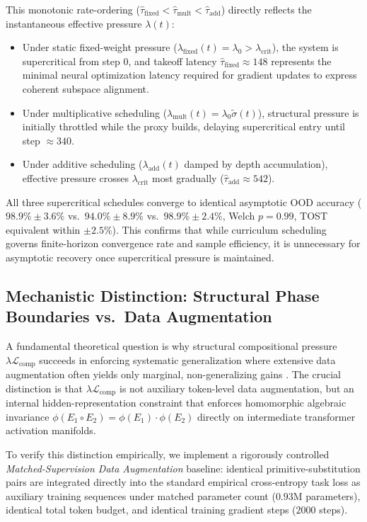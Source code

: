 \documentclass{article}
\theoremstyle{plain}
\theoremstyle{definition}
\begin{document}
This monotonic rate-ordering ($\hat{\tau}_{\text{fixed}} < \hat{\tau}_{\text{mult}} < \hat{\tau}_{\text{add}}$) directly reflects the instantaneous effective pressure $\lambda(t)$:
\begin{itemize}[noitemsep]
    \item Under static fixed-weight pressure ($\lambda_{\text{fixed}}(t) = \lambda_0 > \lambda_{\text{crit}}$), the system is supercritical from step 0, and takeoff latency $\hat{\tau}_{\text{fixed}} \approx 148$ represents the minimal neural optimization latency required for gradient updates to express coherent subspace alignment.
    \item Under multiplicative scheduling ($\lambda_{\text{mult}}(t) = \lambda_0 \tilde{\sigma}(t)$), structural pressure is initially throttled while the proxy builds, delaying supercritical entry until step $\approx 340$.
    \item Under additive scheduling ($\lambda_{\text{add}}(t)$ damped by depth accumulation), effective pressure crosses $\lambda_{\text{crit}}$ most gradually ($\hat{\tau}_{\text{add}} \approx 542$).
\end{itemize}
All three supercritical schedules converge to identical asymptotic OOD accuracy ($98.9\% \pm 3.6\%$ vs.\ $94.0\% \pm 8.9\%$ vs.\ $98.9\% \pm 2.4\%$, Welch $p = 0.99$, TOST equivalent within $\pm 2.5\%$). This confirms that while curriculum scheduling governs finite-horizon convergence rate and sample efficiency, it is unnecessary for asymptotic recovery once supercritical pressure is maintained.

\subsection{Mechanistic Distinction: Structural Phase Boundaries vs.\ Data Augmentation}
\label{sec:data_aug_distinction}
A fundamental theoretical question is why structural compositional pressure $\lambda \mathcal{L}_{\text{comp}}$ succeeds in enforcing systematic generalization where extensive data augmentation often yields only marginal, non-generalizing gains \citep{Furrer2020Compositional,Jia2016Data}. The crucial distinction is that $\lambda \mathcal{L}_{\text{comp}}$ is not auxiliary token-level data augmentation, but an internal hidden-representation constraint that enforces homomorphic algebraic invariance $\phi(E_1 \circ E_2) = \phi(E_1) \cdot \phi(E_2)$ directly on intermediate transformer activation manifolds.

To verify this distinction empirically, we implement a rigorously controlled \emph{Matched-Supervision Data Augmentation} baseline: identical primitive-substitution pairs are integrated directly into the standard empirical cross-entropy task loss as auxiliary training sequences under matched parameter count ($0.93\text{M}$ parameters), identical total token budget, and identical training gradient steps ($2000$ steps).
\end{document}
